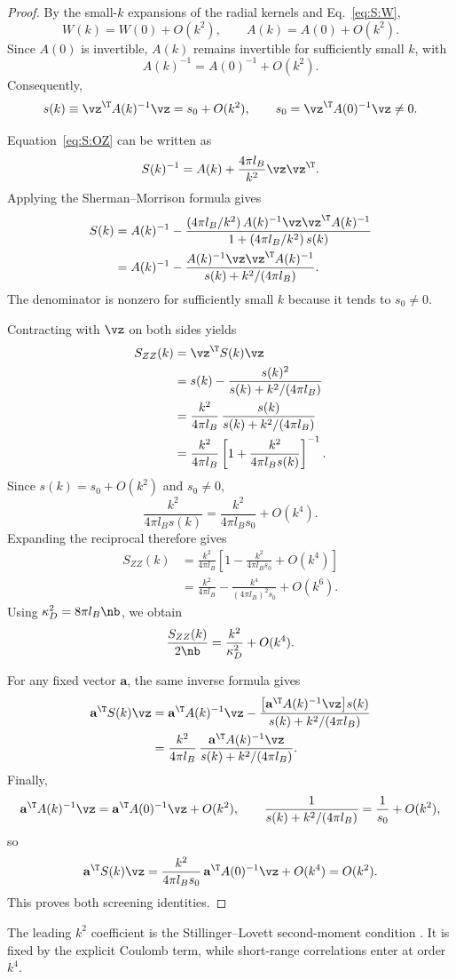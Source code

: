 \begin{proof}
By the small-$k$ expansions of the radial kernels and
Eq.~\ref{eq:S:W},
\[
W(k)=W(0)+O(k^2),
\qquad
A(k)=A(0)+O(k^2).
\]
Since $A(0)$ is invertible, $A(k)$ remains invertible for
sufficiently small $k$, with
\[
A(k)^{-1}=A(0)^{-1}+O(k^2).
\]
Consequently,
\[
s(k)\equiv\vz^{\T}A(k)^{-1}\vz
=s_0+O(k^2),
\qquad
s_0=\vz^{\T}A(0)^{-1}\vz\neq0.
\]

Equation~\ref{eq:S:OZ} can be written as
\[
S(k)^{-1}
=
A(k)+\frac{4\pi l_B}{k^2}\vz\vz^{\T}.
\]
Applying the Sherman--Morrison formula gives
\[
\begin{aligned}
S(k)
&=
A(k)^{-1}
-
\frac{
(4\pi l_B/k^2)\,
A(k)^{-1}\vz\vz^{\T}A(k)^{-1}
}{
1+(4\pi l_B/k^2)\,s(k)
}\\
&=
A(k)^{-1}
-
\frac{
A(k)^{-1}\vz\vz^{\T}A(k)^{-1}
}{
s(k)+k^2/(4\pi l_B)
}.
\end{aligned}
\]
The denominator is nonzero for sufficiently small $k$
because it tends to $s_0\neq0$.

Contracting with $\vz$ on both sides yields
\[
\begin{aligned}
S_{ZZ}(k)
&=\vz^{\T}S(k)\vz\\
&=
s(k)-\frac{s(k)^2}{s(k)+k^2/(4\pi l_B)}\\
&=
\frac{k^2}{4\pi l_B}\,
\frac{s(k)}{s(k)+k^2/(4\pi l_B)}\\
&=
\frac{k^2}{4\pi l_B}
\left[1+\frac{k^2}{4\pi l_Bs(k)}\right]^{-1}.
\end{aligned}
\]
Since $s(k)=s_0+O(k^2)$ and $s_0\neq0$,
\[
\frac{k^2}{4\pi l_Bs(k)}
=
\frac{k^2}{4\pi l_Bs_0}+O(k^4).
\]
Expanding the reciprocal therefore gives
\[
\begin{aligned}
S_{ZZ}(k)
&=
\frac{k^2}{4\pi l_B}
\left[
1-\frac{k^2}{4\pi l_Bs_0}+O(k^4)
\right]\\
&=
\frac{k^2}{4\pi l_B}
-\frac{k^4}{(4\pi l_B)^2s_0}
+O(k^6).
\end{aligned}
\]
Using $\kappa_D^2=8\pi l_B\nb$, we obtain
\[
\frac{S_{ZZ}(k)}{2\nb}
=
\frac{k^2}{\kappa_D^2}+O(k^4).
\]

For any fixed vector $\mathbf a$, the same inverse formula
gives
\[
\begin{aligned}
\mathbf a^{\T}S(k)\vz
&=
\mathbf a^{\T}A(k)^{-1}\vz
-
\frac{
\big[\mathbf a^{\T}A(k)^{-1}\vz\big]s(k)
}{
s(k)+k^2/(4\pi l_B)
}\\
&=
\frac{k^2}{4\pi l_B}\,
\frac{
\mathbf a^{\T}A(k)^{-1}\vz
}{
s(k)+k^2/(4\pi l_B)
}.
\end{aligned}
\]
Finally,
\[
\mathbf a^{\T}A(k)^{-1}\vz
=
\mathbf a^{\T}A(0)^{-1}\vz+O(k^2),
\qquad
\frac{1}{s(k)+k^2/(4\pi l_B)}
=
\frac{1}{s_0}+O(k^2),
\]
so
\[
\mathbf a^{\T}S(k)\vz
=
\frac{k^2}{4\pi l_Bs_0}\,
\mathbf a^{\T}A(0)^{-1}\vz
+O(k^4)
=
O(k^2).
\]
This proves both screening identities. 
\end{proof}

The leading $k^2$ coefficient is the Stillinger--Lovett second-moment condition \cite{stillinger1968general}. It is fixed by the explicit Coulomb term, while short-range correlations enter at order $k^4$. 